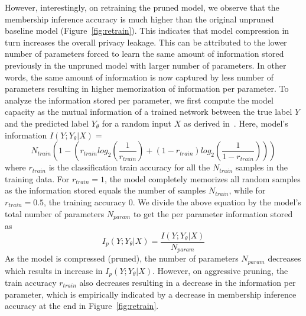 However, interestingly, on retraining the pruned model, we observe that the membership inference accuracy is much higher than the original unpruned baseline model (Figure~\ref{fig:retrain}).
This indicates that model compression in turn increases the overall privacy leakage.
This can be attributed to the lower number of parameters forced to learn the same amount of information stored previously in the unpruned model with larger number of parameters.
In other words, the same amount of information is now captured by less number of parameters resulting in higher memorization of information per parameter.
To analyze the information stored per parameter, we first compute the model capacity as the mutual information of a trained network between the true label $Y$ and the predicted label $Y_{\theta}$ for a random input $X$ as derived in~\cite{45932,cap}.
Here, model's information $I(Y;Y_{\theta}|X) = $
\begin{equation}
N_{train}\left(1 - (r_{train}log_2(\frac{1}{r_{train}}) + (1-r_{train})log_2(\frac{1}{1-r_{train}}))\right)
\end{equation}
where $r_{train}$ is the classification train accuracy for all the $N_{train}$ samples in the training data.
For $r_{train} = 1$, the model completely memorizes all random samples as the information stored equals the number of samples $N_{train}$, while for $r_{train}=0.5$, the training accuracy 0.
We divide the above equation by the model's total number of parameters $N_{param}$ to get the per parameter information stored as
\begin{equation}
I_p(Y;Y_{\theta}|X) = \frac{I(Y;Y_{\theta}|X)}{N_{param}}
\end{equation}
As the model is compressed (pruned), the number of parameters $N_{param}$ decreases which results in increase in $I_p(Y;Y_{\theta}|X)$. However, on aggressive pruning, the train accuracy $r_{train}$ also decreases resulting in a decrease in the information per parameter, which is empirically indicated by a decrease in membership inference accuracy at the end in Figure~\ref{fig:retrain}.


